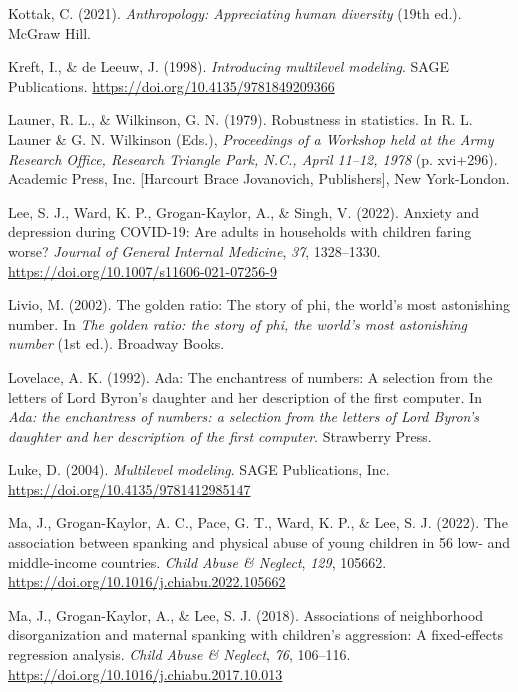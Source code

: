 \documentclass[
  letterpaper,
  DIV=11,
  numbers=noendperiod]{scrreprt}
\newlength{\cslhangindent}
\newenvironment{CSLReferences}[2] %
 {\begin{list}{}{%
  \setlength{\itemindent}{0pt}
  \setlength{\leftmargin}{0pt}
  \setlength{\parsep}{0pt}
  \ifodd #1
   \setlength{\leftmargin}{\cslhangindent}
   \setlength{\itemindent}{-1\cslhangindent}
  \fi
  \setlength{\itemsep}{#2\baselineskip}}}
 {\end{list}}
\begin{document}
\begin{CSLReferences}{1}{0}
Kottak, C. (2021). \emph{Anthropology: Appreciating human diversity}
(19th ed.). McGraw Hill.

Kreft, I., \& de Leeuw, J. (1998). \emph{Introducing multilevel
modeling}. SAGE Publications.
\url{https://doi.org/10.4135/9781849209366}

Launer, R. L., \& Wilkinson, G. N. (1979). Robustness in statistics. In
R. L. Launer \& G. N. Wilkinson (Eds.), \emph{Proceedings of a
{W}orkshop held at the {A}rmy {R}esearch {O}ffice, {R}esearch {T}riangle
{P}ark, {N}.{C}., {A}pril 11--12, 1978} (p. xvi+296). Academic Press,
Inc. {[}Harcourt Brace Jovanovich, Publishers{]}, New York-London.

Lee, S. J., Ward, K. P., Grogan-Kaylor, A., \& Singh, V. (2022). Anxiety
and depression during {COVID-19}: Are adults in households with children
faring worse? \emph{Journal of General Internal Medicine}, \emph{37},
1328--1330. \url{https://doi.org/10.1007/s11606-021-07256-9}

Livio, M. (2002). The golden ratio: The story of phi, the world's most
astonishing number. In \emph{The golden ratio: the story of phi, the
world's most astonishing number} (1st ed.). Broadway Books.

Lovelace, A. K. (1992). Ada: The enchantress of numbers: A selection
from the letters of {L}ord {B}yron's daughter and her description of the
first computer. In \emph{Ada: the enchantress of numbers: a selection
from the letters of {L}ord {B}yron's daughter and her description of the
first computer}. Strawberry Press.

Luke, D. (2004). \emph{Multilevel modeling}. SAGE Publications, Inc.
\url{https://doi.org/10.4135/9781412985147}

Ma, J., Grogan-Kaylor, A. C., Pace, G. T., Ward, K. P., \& Lee, S. J.
(2022). {The association between spanking and physical abuse of young
children in 56 low- and middle-income countries}. \emph{Child Abuse \&
Neglect}, \emph{129}, 105662.
\url{https://doi.org/10.1016/j.chiabu.2022.105662}

Ma, J., Grogan-Kaylor, A., \& Lee, S. J. (2018). Associations of
neighborhood disorganization and maternal spanking with children's
aggression: A fixed-effects regression analysis. \emph{Child Abuse \&
Neglect}, \emph{76}, 106--116.
\url{https://doi.org/10.1016/j.chiabu.2017.10.013}


\end{CSLReferences}
\end{document}
